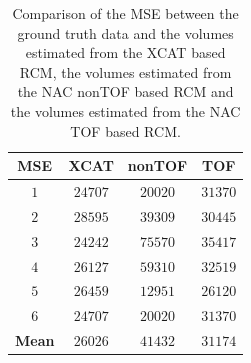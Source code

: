 \documentclass{IEEEtran}
\begin{document}
\begin{table}
    \vspace{-0.2cm}
    
    \centering
    \small
    \caption{Comparison of the MSE between the ground truth data and the volumes estimated from the XCAT based RCM, the volumes estimated from the NAC nonTOF based RCM and the volumes estimated from the NAC TOF based RCM.}
    \begin{tabular}{||c|ccc||}
        \hline
            \textbf{MSE}    & \textbf{XCAT} & \textbf{nonTOF}   & \textbf{TOF}  \\
        \hline
            \textbf{$1$}    & $24707$       & $20020$           & $31370$       \\
            \textbf{$2$}    & $28595$       & $39309$           & $30445$       \\
            \textbf{$3$}    & $24242$       & $75570$           & $35417$       \\
            \textbf{$4$}    & $26127$       & $59310$           & $32519$       \\
            \textbf{$5$}    & $26459$       & $12951$           & $26120$       \\
            \textbf{$6$}    & $24707$       & $20020$           & $31370$       \\
        \hline
            \textbf{Mean}   & $26026$       & $41432$           & $31174$       \\
        \hline
    \end{tabular}
    \label{tab:mse}
    
    \vspace{-0.2cm}
\end{table}
\end{document}
